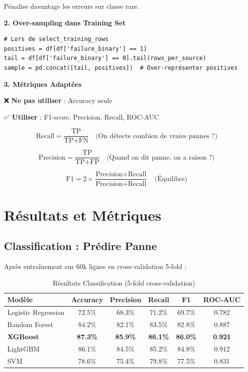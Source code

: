 \documentclass[12pt,a4paper,french]{article}
\begin{document}
Pénalise davantage les erreurs sur classe rare.

\textbf{2. Over-sampling dans Training Set}

\begin{lstlisting}
# Lors de select_training_rows
positives = df[df['failure_binary'] == 1]
tail = df[df['failure_binary'] == 0].tail(rows_per_source)
sample = pd.concat([tail, positives])  # Over-représenter positives
\end{lstlisting}

\textbf{3. Métriques Adaptées}

❌ \textbf{Ne pas utiliser} : Accuracy seule

✅ \textbf{Utiliser} : F1-score, Precision, Recall, ROC-AUC

\begin{equation}
\text{Recall} = \frac{\text{TP}}{\text{TP} + \text{FN}} \quad \text{(On détecte combien de vraies pannes ?)}
\end{equation}

\begin{equation}
\text{Precision} = \frac{\text{TP}}{\text{TP} + \text{FP}} \quad \text{(Quand on dit panne, on a raison ?)}
\end{equation}

\begin{equation}
\text{F1} = 2 \times \frac{\text{Precision} \times \text{Recall}}{\text{Precision} + \text{Recall}} \quad \text{(Équilibre)}
\end{equation}

\section{Résultats et Métriques}

\subsection{Classification : Prédire Panne}

Après entraînement sur 60k lignes en cross-validation 5-fold :

\begin{table}[H]
\centering
\small
\begin{tabular}{|l|c|c|c|c|c|}
\hline
\textbf{Modèle} & \textbf{Accuracy} & \textbf{Precision} & \textbf{Recall} & \textbf{F1} & \textbf{ROC-AUC} \\
\hline
Logistic Regression & 72.5\% & 68.3\% & 71.2\% & 69.7\% & 0.782 \\
Random Forest & 84.2\% & 82.1\% & 83.5\% & 82.8\% & 0.887 \\
\textbf{XGBoost} & \textbf{87.3\%} & \textbf{85.9\%} & \textbf{86.1\%} & \textbf{86.0\%} & \textbf{0.921} \\
LightGBM & 86.1\% & 84.5\% & 85.2\% & 84.8\% & 0.912 \\
SVM & 78.6\% & 75.4\% & 79.8\% & 77.5\% & 0.831 \\
\hline
\end{tabular}
\caption{Résultats Classification (5-fold cross-validation)}
\end{table}
\end{document}
